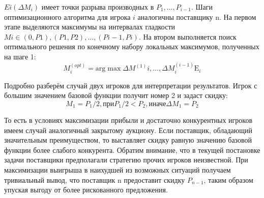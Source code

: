 $Ei(\Delta M_i)$ имеет точки разрыва производных в $P_1,\dots,P_{i-1}$. Шаги оптимизационного алгоритма для игрока $i$ аналогичны поставщику n. На первом этапе выделяются максимумы на интервалах гладкости $Mi \in (0,P1) ,(P1,P2) ,\dots,(Pi-1,Pi)$. 
На втором выполняется поиск оптимального решения по конечному набору локальных максимумов, полученных на шаге 1: 
\begin{equation}
	M_i^{(opt)}= \text{arg} \max \Delta M^{(1)}i,\dots,\Delta M^{(i-1)}_i \mathrm{E}_i 
\end{equation}

Подробно разберём случай двух игроков для интерпретации результатов. Игрок с большим значением базовой функции получит номер 2 и задаст скидку:
\begin{equation}
	M_1=P_1/2 , при P_1/2 < P_2 , \text{иначе} \Delta M_1=P_2 
\end{equation}

То есть в условиях максимизации прибыли и достаточно конкурентных игроков имеем случай аналогичный закрытому аукциону. Если поставщик, обладающий значительным преимуществом, то выставляет скидку равную значению базовой функции более слабого конкурента.
Обратим внимание, что в текущей постановке задачи поставщики предполагали стратегию прочих игроков неизвестной. При максимизации выигрыша в наихудшей из возможных ситуаций получаем тривиальный вывод, что поставщик n предоставит скидку $P_{n-1}$, таким образом упуская выгоду от более рискованного предложения. 
